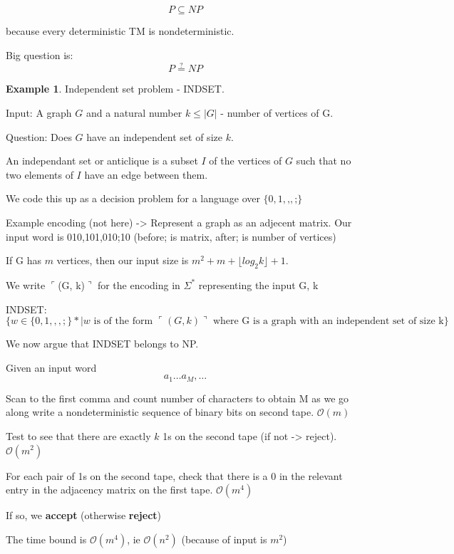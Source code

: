 \documentclass[a4paper,12pt]{article}
\theoremstyle{definition}
\newtheorem{example}[counter]{Example}
\theoremstyle{remark}
\begin{document}
\begin{equation*}
    P \subseteq NP
\end{equation*}

because every deterministic TM is nondeterministic.

Big question is:
\begin{equation*}
    P \stackrel{?}{=} NP
\end{equation*}

\begin{example}
    Independent set problem - INDSET.

    Input: A graph $G$ and a natural number $k \leq |G|$ - number of vertices of G.

    Question: Does $G$ have an independent set of size $k$.

    An independant set or anticlique is a subset $I$ of the vertices of $G$ such that no two elements of $I$ have an edge between them.

    We code this up as a decision problem for a language over $\{0, 1, \texttt{,}, \texttt{;}\}$

    Example encoding (not here) ->
    Represent a graph as an adjecent matrix.
    Our input word is 010,101,010;10 (before; is matrix, after; is number of vertices)

    If G has $m$ vertices, then our input size is $m^2 + m + \lfloor log_2 k \rfloor + 1$.

    We write $\ulcorner$(G, k)$\urcorner$ for the encoding in $\Sigma^*$ representing the input G, k

    INDSET:
    \begin{dmath*}
        \{w \in \{0, 1, ,, ;\}* | w \text{ is of the form } \ulcorner (G, k) \urcorner \text{ where G is a graph with an independent set of size k}\}
    \end{dmath*}

    We now argue that INDSET belongs to NP.

    Given an input word
    \begin{equation*}
        a_1 \dots a_M, \dots
    \end{equation*}

    Scan to the first comma and count number of characters to obtain M as we go along write a nondeterministic sequence of binary bits on second tape. $\mathscr{O}(m)$

    Test to see that there are exactly $k$ 1s on the second tape (if not -> reject). $\mathscr{O}(m^2)$

    For each pair of 1s on the second tape, check that there is a $0$ in the relevant entry in the adjacency matrix on the first tape. $\mathscr{O}(m^4)$

    If so, we \textbf{accept} (otherwise \textbf{reject})

    The time bound is $\mathscr{O}(m^4)$, ie $\mathscr{O}(n^2)$ (because of input is $m^2$)
\end{example}
\end{document}
